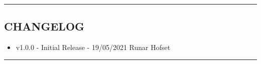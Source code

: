 \documentclass[11pt,a4paper,british]{nuctut}
\newcommand{\version}{Version 1.0.0 - 19/05/2021}
\begin{document}




\newpage
\pagestyle{fancy}
\setlength{\headheight}{60pt}
\lhead{\leftmark}
\tableofcontents{}
\noindent\rule[0.5ex]{1\columnwidth}{1pt}
\subsection*{CHANGELOG}
\small{
\begin{itemize}
    \item v1.0.0 - Initial Release - 19/05/2021 Runar Hofset
\end{itemize}
}

\noindent\rule[0.5ex]{1\columnwidth}{1pt}

\newpage
{} %

















%


\renewcommand\thesection{\Alph{section}}
\setcounter{section}{0}

%
%
\newpage


\printbibliography
{}


\newpage
\end{document}
